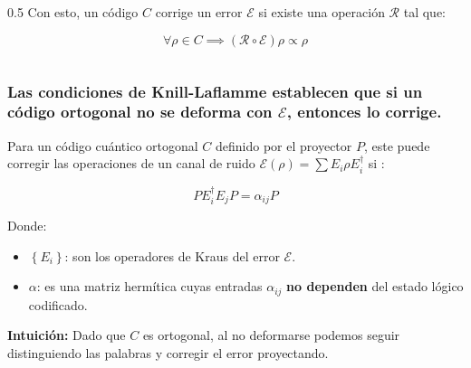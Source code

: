 \begin{frame}
\begin{columns}[c]
\begin{column}{0.5\textwidth}
          Con esto, un código $C$ corrige un error $\mathcal{E}$ si existe una operación $\mathcal{R}$ tal que:

          \begin{equation}
            \forall \rho \in C \implies (\mathcal{R} \circ \mathcal{E}) \rho \propto \rho
            \label{eq:error_correct}
          \end{equation}

        \end{column}
      \end{columns}
\end{frame}

\begin{frame}
  \frametitle{Las condiciones de Knill-Laflamme establecen que si un código ortogonal no se deforma con $\mathcal{E}$, entonces lo corrige.}

  Para un código cuántico ortogonal $C$ definido por el proyector $P$, este puede corregir las operaciones de un canal de ruido $\mathcal{E}(\rho) = \sum E_i \rho E_i^\dagger$ si \citep{Nielsen2010}:

    \begin{equation}
      P E_i^\dagger E_j P = \alpha_{ij} P
      \label{eq:knill-laflame}
    \end{equation}

  \vspace{0.5cm}
  Donde:
  \begin{itemize}
    \item \textbf{$\left\{E_i\right\}$}: son los operadores de Kraus del error $\mathcal{E}$.
    \item \textbf{$\alpha$}: es una matriz hermítica cuyas entradas $\alpha_{ij}$ \textbf{no dependen} del estado lógico codificado.
  \end{itemize}

  \textbf{Intuición:} Dado que $C$ es ortogonal, al no deformarse podemos seguir distinguiendo las palabras y corregir el error proyectando.

\end{frame}
